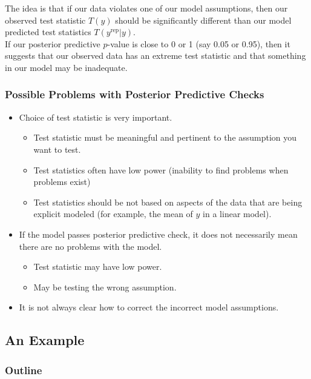 \documentclass[handout]{beamer}
\begin{document}
\begin{frame}
The idea is that if our data violates one of our model assumptions,
then our observed test statistic $T(y)$ should be significantly
different than our model predicted test statistics $T(y^{\mathrm{rep}} | y)$.\\
\bigskip
\pause
If our posterior predictive $p$-value is close to 0 or 1 (say 0.05 or
0.95), then it suggests that our observed data has an extreme test
statistic and that something in our model may be inadequate.
\end{frame}

\begin{frame}
\frametitle{Possible Problems with Posterior Predictive Checks}
\pause
\begin{itemize}
\item Choice of test statistic is very important.
\pause
\begin{itemize}
\item Test statistic must be meaningful and pertinent to the
assumption you want to test.
\pause
\item Test statistics often have low power (inability to find problems
when problems exist)
\pause
\item Test statistics should be not based on aspects of the data that
are being explicit modeled (for example, the mean of $y$ in a linear model).
\end{itemize}
\pause
\medskip
\item If the model passes posterior predictive check, it does not
necessarily mean there are no problems with the model.
\begin{itemize}
\pause
\item Test statistic may have low power.
\pause
\item May be testing the wrong assumption.
\end{itemize}
\pause
\medskip
\item It is not always clear how to correct the incorrect model assumptions.
\end{itemize}
\end{frame}

\subsection{An Example}

\begin{frame}
\frametitle{Outline}
\tableofcontents[currentsubsection]
\end{frame}
\end{document}
